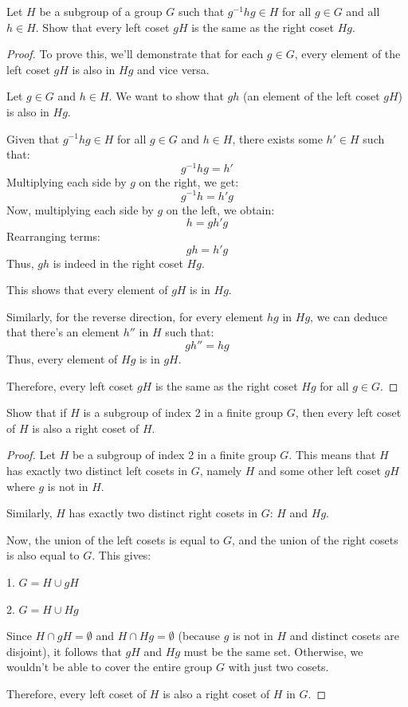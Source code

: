 \documentclass[12pt]{amsart}
\theoremstyle{definition}
\numberwithin{equation}{section}
\theoremstyle{plain}
\begin{document}
\begin{exercise}{28} Let $H$ be a subgroup of a group $G$ such that $g^{-1}hg \in H$ for all $g \in G$ and all $h \in H$. 
    Show that every left coset $gH$ is the same as the right coset $Hg$.
    
    \begin{proof}
        To prove this, we'll demonstrate that for each \( g \in G \), every element of the left coset \( gH \) is also in \( Hg \) and vice versa.

Let \( g \in G \) and \( h \in H \). We want to show that \( gh \) (an element of the left coset \( gH \)) is also in \( Hg \).

Given that \( g^{-1}hg \in H \) for all \( g \in G \) and \( h \in H \), there exists some \( h' \in H \) such that:
\[ g^{-1}hg = h' \]
Multiplying each side by \( g \) on the right, we get:
\[ g^{-1}h = h'g \]
Now, multiplying each side by \( g \) on the left, we obtain:
\[ h = g h'g \]
Rearranging terms:
\[ gh = h'g \]
Thus, \( gh \) is indeed in the right coset \( Hg \).

This shows that every element of \( gH \) is in \( Hg \).

Similarly, for the reverse direction, for every element \( hg \) in \( Hg \), we can deduce that there's an element \( h'' \) in \( H \) such that:
\[ gh'' = hg \]
Thus, every element of \( Hg \) is in \( gH \).

Therefore, every left coset \( gH \) is the same as the right coset \( Hg \) for all \( g \in G \).

    \end{proof}
\end{exercise}
\vspace*{20pt}
\begin{exercise}{39} Show that if $H$ is a subgroup of index 2 in a finite group $G$, then every left coset of $H$ is also a right coset of $H$.

\begin{proof}
    Let \( H \) be a subgroup of index 2 in a finite group \( G \). This means that \( H \) has exactly two distinct left cosets in \( G \), namely \( H \) and some other left coset \( gH \) where \( g \) is not in \( H \).
    
    Similarly, \( H \) has exactly two distinct right cosets in \( G \): \( H \) and \( Hg \).
    
    Now, the union of the left cosets is equal to \( G \), and the union of the right cosets is also equal to \( G \). This gives:
    
    1. \( G = H \cup gH \)

    2. \( G = H \cup Hg \)
    
    Since \( H \cap gH = \emptyset \) and \( H \cap Hg = \emptyset \) (because \( g \) is not in \( H \) and distinct cosets are disjoint), it follows that \( gH \) and \( Hg \) must be the same set. Otherwise, we wouldn't be able to cover the entire group \( G \) with just two cosets.
    
    Therefore, every left coset of \( H \) is also a right coset of \( H \) in \( G \).
\end{proof}
\end{exercise}
\end{document}
